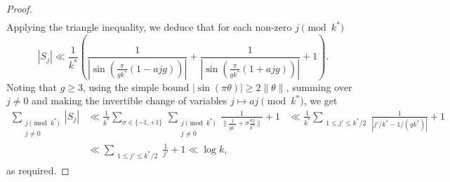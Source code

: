 \documentclass[10pt,a4paper]{amsart}
\newcommand{\sg}{\sigma}
\renewcommand{\ss}{\substack}
\begin{document}
\begin{proof}
\begin{align*}
\end{align*}
Applying the triangle inequality, we deduce that for each non-zero $j \pmod{k^\ast}$
$$
|S_j| \ll \frac{1}{k^\ast}\left(\frac{1}{|\sin(\tfrac{\pi}{gk^\ast}(1-ajg))|} + \frac{1}{|\sin(\tfrac{\pi}{gk^\ast}(1+ajg))|} + 1\right).
$$
Noting that $g \geq 3$, using the simple bound $|\sin(\pi \theta)| \geq 2\|\theta\|$, summing over $j \neq 0$ and making the invertible change of variables $j \mapsto aj \pmod{k^\ast}$, we get
\begin{align*}
\sum_{\ss{j \pmod{k^\ast} \\ j \neq 0}} |S_j| &\ll \frac{1}{k^\ast}\sum_{\sg \in \{-1,+1\}} \, \sum_{\ss{j \pmod{k^\ast} \\ j \neq 0}} \frac{1}{\|\tfrac{1}{gk^\ast} + \sg \tfrac{aj}{k^\ast}\|} + 1 &\ll \frac{1}{k^\ast}\sum_{\ss{1 \leq j' \leq k^\ast/2}} \frac{1}{|j'/k^\ast - 1/(gk^\ast)|} + 1\\
&\ll \sum_{\ss{1 \leq j' \leq k^\ast/2}} \frac{1}{j'} + 1 \ll \log k,
\end{align*}
as required.
\end{proof}
\end{document}
